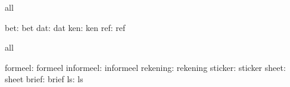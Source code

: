 


\startconstants            all

                      bet: bet
                      dat: dat
                      ken: ken
                      ref: ref

\stopconstants

\startvariables            all

                  formeel: formeel
                informeel: informeel
                 rekening: rekening
                  sticker: sticker
                    sheet: sheet
                    brief: brief
                       ls: ls

\stopvariables


\stoplogginginterface

\endinput
